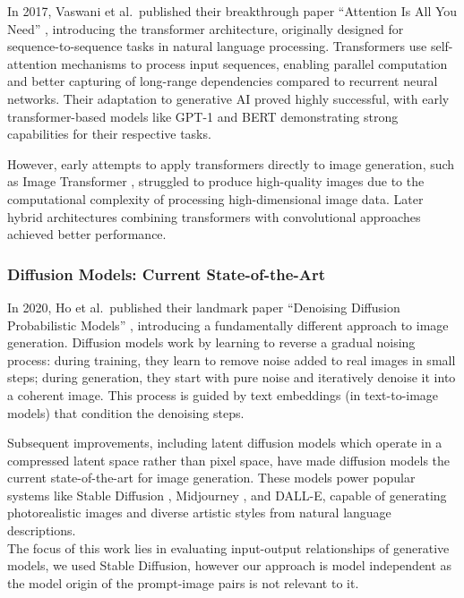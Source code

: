 \documentclass[
  a4paper,  %
  twoside,  %
  bibliography=totoc,
  headsepline,
  cleardoublepage=empty,
  parskip=half,
  draft=false
]{scrbook}
\begin{document}
In 2017, Vaswani et al.\ published their breakthrough paper ``Attention Is All You Need'' \cite{vaswani2023attentionneed}, introducing the transformer architecture, originally designed for sequence-to-sequence tasks in natural language processing. Transformers use self-attention mechanisms to process input sequences, enabling parallel computation and better capturing of long-range dependencies compared to recurrent neural networks. Their adaptation to generative AI proved highly successful, with early transformer-based models like GPT-1 \cite{GPT-1} and BERT \cite{devlin2019bertpretrainingdeepbidirectional} demonstrating strong capabilities for their respective tasks.

However, early attempts to apply transformers directly to image generation, such as Image Transformer \cite{parmar2018imagetransformer}, struggled to produce high-quality images due to the computational complexity of processing high-dimensional image data. Later hybrid architectures combining transformers with convolutional approaches achieved better performance.

\subsubsection{Diffusion Models: Current State-of-the-Art}

In 2020, Ho et al.\ published their landmark paper ``Denoising Diffusion Probabilistic Models'' \cite{ho2020denoisingdiffusionprobabilisticmodels}, introducing a fundamentally different approach to image generation. Diffusion models work by learning to reverse a gradual noising process: during training, they learn to remove noise added to real images in small steps; during generation, they start with pure noise and iteratively denoise it into a coherent image. This process is guided by text embeddings (in text-to-image models) that condition the denoising steps.

Subsequent improvements, including latent diffusion models \cite{rombach2022highresolutionimagesynthesislatent} which operate in a compressed latent space rather than pixel space, have made diffusion models the current state-of-the-art for image generation. These models power popular systems like Stable Diffusion \cite{stable-diffusion}, Midjourney \cite{midjourney}, and DALL-E, capable of generating photorealistic images and diverse artistic styles from natural language descriptions.\\
The focus of this work lies in evaluating input-output relationships of generative models, we used Stable Diffusion, however our approach is model independent as the model origin of the prompt-image pairs is not relevant to it.
\end{document}
